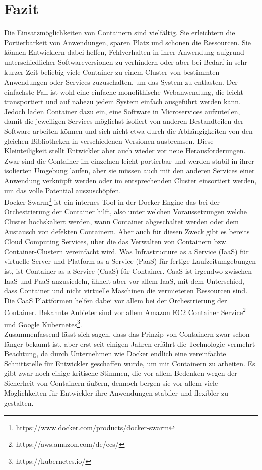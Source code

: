 \chapter{Fazit}

Die Einsatzmöglichkeiten von Containern sind vielfältig. Sie erleichtern die Portierbarkeit von Anwendungen, sparen Platz und schonen die Ressourcen. Sie können Entwicklern dabei helfen, Fehlverhalten in ihrer Anwendung aufgrund unterschiedlicher Softwareversionen zu verhindern oder aber bei Bedarf in sehr kurzer Zeit beliebig viele Container zu einem Cluster von bestimmten Anwendungen oder Services zuzuschalten, um das System zu entlasten. Der einfachste Fall ist wohl eine einfache monolithische Webanwendung, die leicht transportiert und auf nahezu jedem System einfach ausgeführt werden kann. Jedoch laden Container dazu ein, eine Software in Microservices aufzuteilen, damit die jeweiligen Services möglichst isoliert von anderen Bestandteilen der Software arbeiten können und sich nicht etwa durch die Abhängigkeiten von den gleichen Bibliotheken in verschiedenen Versionen ausbremsen. Diese Kleinteiligkeit stellt Entwickler aber auch wieder vor neue Herausforderungen. Zwar sind die Container im einzelnen leicht portierbar und werden stabil in ihrer isolierten Umgebung laufen, aber sie müssen auch mit den anderen Services einer Anwendung verknüpft werden oder im entsprechenden Cluster einsortiert werden, um das volle Potential auszuschöpfen.\\

\noindent Docker-Swarm\footnote{https://www.docker.com/products/docker-swarm} ist ein internes Tool in der Docker-Engine das bei der Orchestrierung der Container hilft, also unter welchen Voraussetzungen welche Cluster hochskaliert werden, wann Container abgeschaltet werden oder dem Austausch von defekten Containern.
Aber auch für diesen Zweck gibt es bereits Cloud Computing Services, über die das Verwalten von Containern bzw. Container-Clustern vereinfacht wird. Was Infrastructure as a Service (IaaS) für virtuelle Server und Platform as a Service (PaaS) für fertige Laufzeitumgebungen ist, ist Container as a Service (CaaS) für Container. CaaS ist irgendwo zwischen IaaS und PaaS anzusiedeln, ähnelt aber vor allem IaaS, mit dem Unterschied, dass Container und nicht virtuelle Maschinen die vermieteten Ressourcen sind. Die CaaS Plattformen helfen dabei vor allem bei der Orchestrierung der Container. Bekannte Anbieter sind vor allem Amazon EC2 Container Service\footnote{https://aws.amazon.com/de/ecs/} und Google Kubernetes\footnote{https://kubernetes.io/}.\\

\noindent Zusammenfassend lässt sich sagen, dass das Prinzip von Containern zwar schon länger bekannt ist, aber erst seit einigen Jahren erfährt die Technologie vermehrt Beachtung, da durch Unternehmen wie Docker endlich eine vereinfachte Schnittstelle für Entwickler geschaffen wurde, um mit Containern zu arbeiten. Es gibt zwar noch einige kritische Stimmen, die vor allem Bedenken wegen der Sicherheit von Containern äußern, dennoch bergen sie vor allem viele Möglichkeiten für Entwickler ihre Anwendungen stabiler und flexibler zu gestalten.\\
% 
